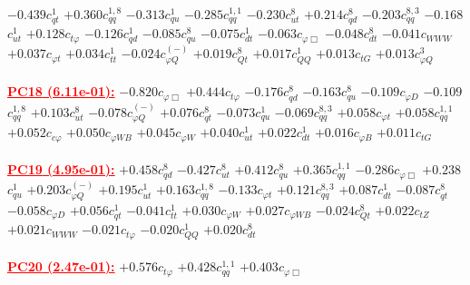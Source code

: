\documentclass{article}
\begin{document}
{$-0.439$}{\rm $c_{qt}^{1}$}
{$+0.360$}{\rm $c_{qq}^{1,8}$}
{$-0.313$}{\rm $c_{qu}^{1}$}
{$-0.285$}{\rm $c_{qq}^{1,1}$}
{$-0.230$}{\rm $c_{ut}^{8}$}
{$+0.214$}{\rm $c_{qd}^{8}$}
{$-0.203$}{\rm $c_{qq}^{8,3}$}
{$-0.168$}{\rm $c_{ut}^{1}$}
{$+0.128$}{\rm $c_{t \varphi}$}
{$-0.126$}{\rm $c_{qd}^{1}$}
{$-0.085$}{\rm $c_{qu}^{8}$}
{$-0.075$}{\rm $c_{dt}^{1}$}
{$-0.063$}{\rm $c_{\varphi \Box}$}
{$-0.048$}{\rm $c_{dt}^{8}$}
{$-0.041$}{\rm $c_{WWW}$}
{$+0.037$}{\rm $c_{\varphi t}$}
{$+0.034$}{\rm $c_{tt}^{1}$}
{$-0.024$}{\rm $c_{\varphi Q}^{(-)}$}
{$+0.019$}{\rm $c_{Qt}^{8}$}
{$+0.017$}{\rm $c_{QQ}^{1}$}
{$+0.013$}{\rm $c_{tG}$}
{$+0.013$}{\rm $c_{\varphi Q}^{3}$}
 \nonumber \\ \nonumber \\
\noindent \textcolor{red}{\underline{\bf{PC18} (6.11e-01):}}
{$-0.820$}{\rm $c_{\varphi \Box}$}
{$+0.444$}{\rm $c_{t \varphi}$}
{$-0.176$}{\rm $c_{qd}^{8}$}
{$-0.163$}{\rm $c_{qu}^{8}$}
{$-0.109$}{\rm $c_{\varphi D}$}
{$-0.109$}{\rm $c_{qq}^{1,8}$}
{$+0.103$}{\rm $c_{ut}^{8}$}
{$-0.078$}{\rm $c_{\varphi Q}^{(-)}$}
{$+0.076$}{\rm $c_{qt}^{8}$}
{$-0.073$}{\rm $c_{qu}^{1}$}
{$-0.069$}{\rm $c_{qq}^{8,3}$}
{$+0.058$}{\rm $c_{\varphi t}$}
{$+0.058$}{\rm $c_{qq}^{1,1}$}
{$+0.052$}{\rm $c_{c \varphi}$}
{$+0.050$}{\rm $c_{\varphi WB}$}
{$+0.045$}{\rm $c_{\varphi W}$}
{$+0.040$}{\rm $c_{ut}^{1}$}
{$+0.022$}{\rm $c_{dt}^{1}$}
{$+0.016$}{\rm $c_{\varphi B}$}
{$+0.011$}{\rm $c_{tG}$}
 \nonumber \\ \nonumber \\
\noindent \textcolor{red}{\underline{\bf{PC19} (4.95e-01):}}
{$+0.458$}{\rm $c_{qd}^{8}$}
{$-0.427$}{\rm $c_{ut}^{8}$}
{$+0.412$}{\rm $c_{qu}^{8}$}
{$+0.365$}{\rm $c_{qq}^{1,1}$}
{$-0.286$}{\rm $c_{\varphi \Box}$}
{$+0.238$}{\rm $c_{qu}^{1}$}
{$+0.203$}{\rm $c_{\varphi Q}^{(-)}$}
{$+0.195$}{\rm $c_{ut}^{1}$}
{$+0.163$}{\rm $c_{qq}^{1,8}$}
{$-0.133$}{\rm $c_{\varphi t}$}
{$+0.121$}{\rm $c_{qq}^{8,3}$}
{$+0.087$}{\rm $c_{dt}^{1}$}
{$-0.087$}{\rm $c_{qt}^{8}$}
{$-0.058$}{\rm $c_{\varphi D}$}
{$+0.056$}{\rm $c_{qt}^{1}$}
{$-0.041$}{\rm $c_{tt}^{1}$}
{$+0.030$}{\rm $c_{\varphi W}$}
{$+0.027$}{\rm $c_{\varphi WB}$}
{$-0.024$}{\rm $c_{Qt}^{8}$}
{$+0.022$}{\rm $c_{tZ}$}
{$+0.021$}{\rm $c_{WWW}$}
{$-0.021$}{\rm $c_{t \varphi}$}
{$-0.020$}{\rm $c_{QQ}^{1}$}
{$+0.020$}{\rm $c_{dt}^{8}$}
 \nonumber \\ \nonumber \\
\noindent \textcolor{red}{\underline{\bf{PC20} (2.47e-01):}}
{$+0.576$}{\rm $c_{t \varphi}$}
{$+0.428$}{\rm $c_{qq}^{1,1}$}
{$+0.403$}{\rm $c_{\varphi \Box}$}
\end{document}
